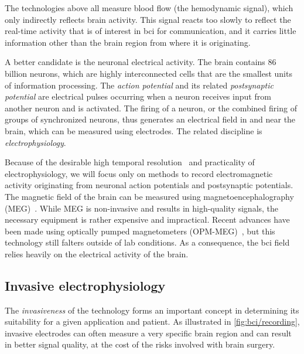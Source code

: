 The technologies above all measure blood flow (the hemodynamic signal), which only
indirectly reflects brain activity.
This signal reacts too slowly to reflect the real-time activity that is of interest in
\ac{bci} for communication, and it carries little information other than the brain
region from where it is originating.

A better candidate is the neuronal electrical activity.
The brain contains 86 billion neurons, which are highly interconnected cells that are
the smallest units of information processing.
The \emph{action potential} and its related \emph{postsynaptic potential} are electrical
pulses occurring when a neuron receives input from another neuron and is activated.
The firing of a neuron, or the combined firing of groups of synchronized neurons, thus
generates an electrical field in and near the brain, which can be measured using
electrodes.
The related discipline is \emph{electrophysiology}.

Because of the desirable high temporal resolution~\cite{Easttom2021} and practicality of
electrophysiology, we will focus only on methods to record electromagnetic activity
originating from neuronal action potentials and postsynaptic potentials.
The magnetic field of the brain can be measured using magnetoencephalography
(MEG)~\cite{Mellinger2007}.
While MEG is non-invasive and results in high-quality signals, the necessary equipment
is rather expensive and impractical.
Recent advances have been made using optically pumped magnetometers
(OPM-MEG)~\cite{Wittevrongel2021}, but this technology still falters outside of lab
conditions.
As a consequence, the \ac{bci} field relies heavily on the electrical activity of the
brain.

\subsection{Invasive electrophysiology}

The \emph{invasiveness} of the technology forms an important concept in determining its
suitability for a given application and patient.
As illustrated in \cref{fig:bci/recording}, invasive electrodes can often measure a
very specific brain region and can result in better signal quality, at the cost of the
risks involved with brain surgery.

